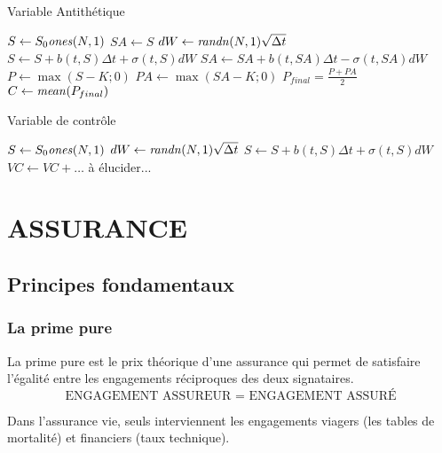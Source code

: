 \documentclass{report}
\begin{document}
\begin{minipage}{0.45\linewidth}
  \begin{algorithm}[H]
        \caption{Variable Antithétique}
        \begin{algorithmic} 
        \STATE $S \leftarrow S_0 \mbox{\textit{ones}}(N,1)$
        \STATE $SA \leftarrow S$
        \STATE $dW \leftarrow \mbox{\textit{randn}}(N,1)\sqrt{\Delta t}$
        \STATE $S \leftarrow S+b(t,S) \Delta t + \sigma (t,S)dW$
        \STATE $SA \leftarrow SA+b(t,SA) \Delta t - \sigma (t,SA)dW$
        \ENDFOR
        \STATE $P \leftarrow \max(S-K;0)$
        \STATE $PA \leftarrow \max(SA-K;0)$
        \STATE $P_{final} = \frac{P+PA}{2}$
        \STATE $C \leftarrow\mbox{\textit{mean}}(P_{final})$
        \end{algorithmic}
        \end{algorithm}
\end{minipage}
\hfill
\begin{minipage}{0.45\linewidth}
  \begin{algorithm}[H]
        \caption{Variable de contrôle}
        \begin{algorithmic} 
        \STATE $S \leftarrow S_0 \mbox{\textit{ones}}(N,1)$
        \STATE $dW \leftarrow \mbox{\textit{randn}}(N,1)\sqrt{\Delta t}$
        \STATE $S \leftarrow S+b(t,S) \Delta t + \sigma (t,S)dW$
        \STATE $VC \leftarrow VC + \dots$
        \ENDFOR
        \STATE à élucider...
        \end{algorithmic}
        \end{algorithm}
\end{minipage}


\chapter{ASSURANCE}
\section{Principes fondamentaux}
\subsection{La prime pure}
La prime pure est le prix théorique d'une assurance qui permet de satisfaire l'égalité entre les engagements réciproques des deux signataires.\[\mbox{ENGAGEMENT ASSUREUR = ENGAGEMENT ASSURÉ}\]

Dans l'assurance vie, seuls interviennent les engagements viagers (les tables de mortalité) et financiers (taux technique).\\
\end{document}
